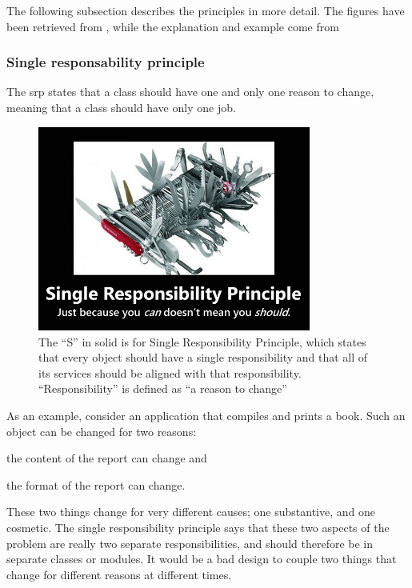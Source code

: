 The following subsection describes the principles in more detail. The figures have been retrieved from \cite{Devilla2009}, while the explanation and example come from \cite{OODesigncom2018,Janssen2018,Laanaya2016,Lipovetskii2017}

\subsubsection{Single responsability principle }
\begin{framed}
The \gls{srp} states that a class should have one and only one reason to change, meaning that a class should have only one job.	
\end{framed}

\begin{figure}
	\centering
	\includegraphics[width=0.8\textwidth]{images/kotlin/SRP.jpg}
	\caption{The “S” in \gls{solid} is for Single Responsibility Principle, which states that every object should have a single responsibility and that all of its services should be aligned with that responsibility. “Responsibility” is defined as “a reason to change”}
	\label{fir:SRP}
\end{figure}
As an example, consider an application that compiles and prints a book. Such an object can be changed for two reasons: \begin{inparaenum}[(i)]
	\item the content of the report can change and
	\item the format of the report can change.
\end{inparaenum}
 These two things change for very different causes; one substantive, and one cosmetic. The single responsibility principle says that these two aspects of the problem are really two separate responsibilities, and should therefore be in separate classes or modules. It would be a bad design to couple two things that change for different reasons at different times.

